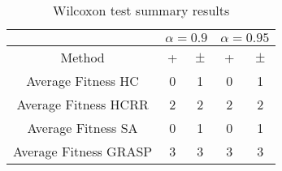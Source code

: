 \documentclass[a4paper,10pt]{article}
\begin{document}
\begin{table}[!htp]
\centering\scriptsize
\begin{tabular}{
|c|c|c|c|c|}
\hline
&\multicolumn{2}{c|}{$\alpha=0.9$} & \multicolumn{2}{c|}{$\alpha=0.95$}\\\hline
Method & + & $\pm$ & + & $\pm$ \\
\hline
Average Fitness HC       & 0 & 1 & 0 & 1\\
\hline
Average Fitness HCRR    & 2 & 2 & 2 & 2\\
\hline
Average Fitness SA      & 0 & 1 & 0 & 1\\
\hline
Average Fitness GRASP & 3 & 3 & 3 & 3\\
\hline

\end{tabular}
\caption{Wilcoxon test summary results}

\end{table}

 \clearpage 
\end{document}

